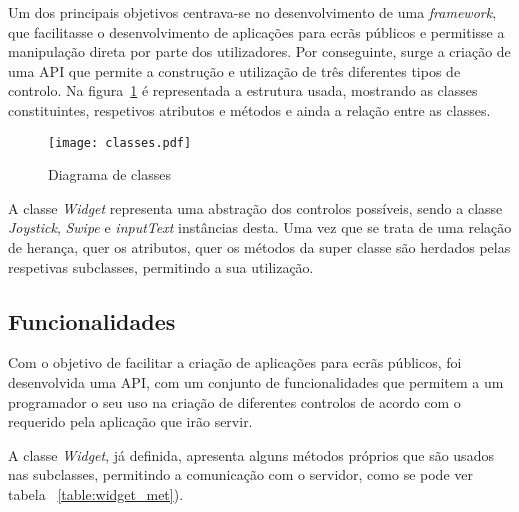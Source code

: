 Um dos principais objetivos centrava-se no desenvolvimento de uma \textit{framework}, que facilitasse o desenvolvimento de aplicações para ecrãs públicos e permitisse a manipulação direta por parte dos utilizadores. Por conseguinte, surge a criação de uma API que permite a construção e utilização de três diferentes tipos de controlo. 
Na figura~\ref{fig:classes} é representada a estrutura usada, mostrando as classes constituintes, respetivos atributos e métodos e ainda a relação entre as classes.

\begin{figure}[ht]
\centering
\texttt{[image: classes.pdf]}
\caption[Diagrama de Classes] {Diagrama de classes}
\label{fig:classes}
\end{figure}

A classe \textit{Widget} representa uma abstração dos controlos possíveis, sendo a classe \textit{Joystick}, \textit{Swipe} e \textit{inputText} instâncias desta. Uma vez que se trata de uma relação de herança, quer os atributos, quer os métodos da super classe são herdados pelas respetivas subclasses, permitindo a sua utilização.

\subsection{Funcionalidades}

	Com o objetivo de facilitar a criação de aplicações para ecrãs públicos, foi desenvolvida uma API, com um conjunto de funcionalidades que permitem a um programador o seu uso na criação de diferentes controlos de acordo com o requerido pela aplicação que irão servir.

	A classe \textit{Widget}, já definida, apresenta alguns métodos próprios que são usados nas subclasses, permitindo a comunicação com o servidor, como se pode ver tabela ~\ref{table:widget_met}).

